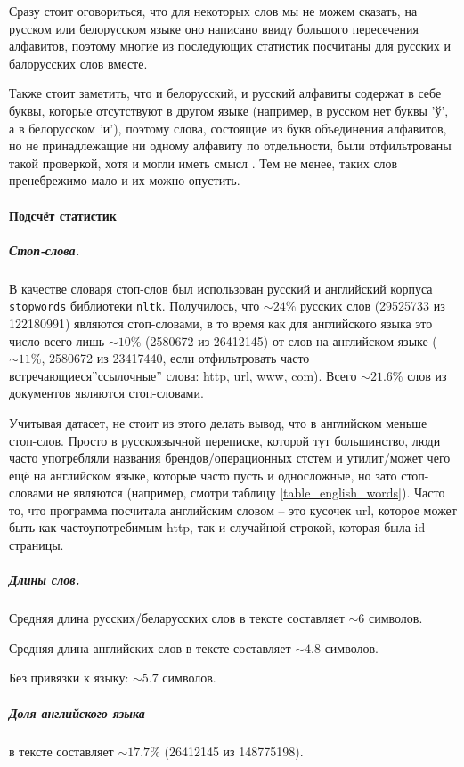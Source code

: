 Сразу стоит оговориться, что для некоторых слов мы не можем сказать, на русском или белорусском языке оно написано ввиду большого пересечения алфавитов, поэтому многие из последующих статистик посчитаны для русских и балорусских слов вместе.

Также стоит заметить, что и белорусский, и русский алфавиты содержат в себе буквы, которые отсутствуют в другом языке (например, в русском нет буквы 'ў', а в белорусском 'и'), поэтому слова, состоящие из букв объединения алфавитов, но не принадлежащие ни одному алфавиту по отдельности, были отфильтрованы такой проверкой, хотя и могли иметь смысл . Тем не менее, таких слов пренебрежимо мало и их можно опустить.


\paragraph{Подсчёт статистик}

\subparagraph{Стоп-слова.}

В качестве словаря стоп-слов был использован русский и английский корпуса \texttt{stopwords} библиотеки \texttt{nltk}. Получилось, что $\sim24\%$ русских слов (29525733 из 122180991) являются стоп-словами, в то время как для английского языка это число всего лишь $\sim10\%$ (2580672 из 26412145) от слов на английском языке ($\sim11\%$, 2580672 из 23417440, если отфильтровать часто встречающиеся''ссылочные'' слова: http, url, www, com). Всего $\sim 21.6\%$ слов из документов являются стоп-словами. 

Учитывая датасет, не стоит из этого делать вывод, что в английском меньше стоп-слов. Просто в русскоязычной переписке, которой тут большинство, люди часто употребляли названия брендов/операционных стстем и утилит/может чего ещё на английском языке, которые часто пусть и односложные, но зато стоп-словами не являются (например, смотри таблицу \ref{table_english_words}). Часто то, что программа посчитала английским словом -- это кусочек url, которое может быть как частоупотребимым http, так и случайной строкой, которая была id страницы.

\subparagraph{Длины слов.}

Средняя длина русских/беларусских слов в тексте составляет $\sim 6$ символов.

Средняя длина английских слов в тексте составляет $\sim 4.8$ символов.

Без привязки к языку: $\sim 5.7$ символов.


\subparagraph{Доля английского языка} в тексте составляет $\sim 17.7\%$ (26412145 из 148775198).

